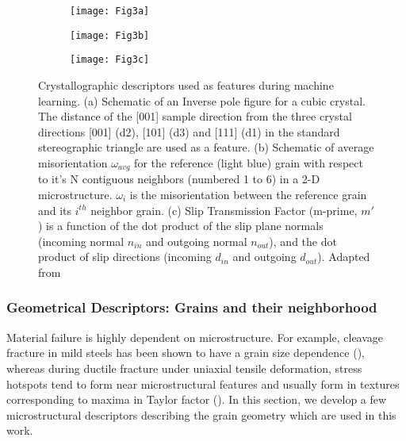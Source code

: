 \documentclass[preprint,1p,times,authoryear]{elsarticle}%
\begin{document}
\begin{figure*}[!htb]
\centering
    \begin{subfigure}[t]{0.33\textwidth}
        \centering
        \texttt{[image: Fig3a]}%
        \caption{}
        \label{fig:IPFschematic_1}
    \end{subfigure}
    \hspace{\fill}
    \begin{subfigure}[t]{0.25\textwidth}
        \centering
        \texttt{[image: Fig3b]}%
        \caption{}
        \label{fig:misorientation}
    \end{subfigure}
    \begin{subfigure}[b]{0.4\textwidth}
        \centering
        \texttt{[image: Fig3c]}%
        \caption{}
        \label{fig:stm}
    \end{subfigure}
    \caption{Crystallographic descriptors used as features during machine learning. (a) Schematic of an Inverse pole figure for a cubic crystal. The distance of the [001] sample direction from the three crystal directions [001] (d2), [101] (d3) and [111] (d1) in the standard stereographic triangle are used as a feature. (b) Schematic of average misorientation $\omega_{avg}$ for the reference (light blue) grain with respect to it's N contiguous neighbors (numbered 1 to 6) in a 2-D microstructure. $\omega_i$ is the misorientation between the reference grain and its $i^{th}$ neighbor grain. (c) Slip Transmission Factor (m-prime, $m'$) is a function of the dot product of the slip plane normals (incoming normal $n_{in}$ and outgoing normal $n_{out}$), and the dot product of slip directions  (incoming $d_{in}$ and outgoing $d_{out}$). Adapted from \cite{mprime}}
    \label{fig:123}
\end{figure*}


\subsubsection{Geometrical Descriptors: Grains and their neighborhood}
Material failure is highly dependent on microstructure. For example, cleavage fracture in mild steels has been shown to have a grain size dependence (\cite{Smith1968}), whereas during ductile fracture under uniaxial tensile deformation, stress hotspots tend to form near microstructural features and usually form in textures corresponding to maxima in Taylor factor (\cite{Rollett2010a}). In this section, we  develop a few microstructural descriptors describing the grain geometry which are used in this work.
\end{document}
